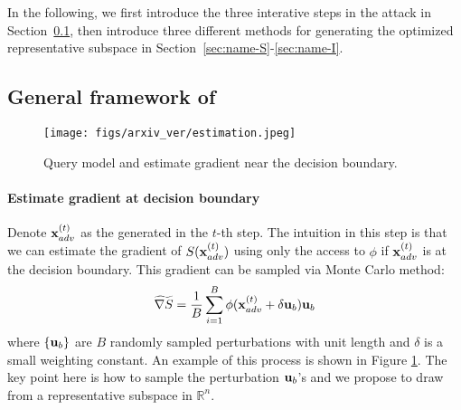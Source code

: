 In the following, we first introduce the three interative steps in the attack in Section~\ref{sec:iterative_attack}, then introduce three different methods for generating the optimized representative subspace in Section~\ref{sec:name-S}-\ref{sec:name-I}. 

\subsection{General framework of \name}
\label{sec:iterative_attack}

\begin{figure}
    \centering
    \texttt{[image: figs/arxiv\_ver/estimation.jpeg]}
    \caption{Query model and estimate gradient near the decision boundary.}
    \label{fig:gradient_estimation}
\end{figure}

\paragraph{Estimate gradient at decision boundary}
Denote ${\bf x}_{adv}^{(t)}$ as the \advimage generated in the $t$-th step. The intuition in this step is that we can estimate the gradient of $S({\bf x}_{adv}^{(t)})$ using only the access to $\phi$ if ${\bf x}_{adv}^{(t)}$ is at the decision boundary. This gradient can be sampled via Monte Carlo method:
\begin{align}
    \widetilde{\nabla S} = \frac1B \sum_{i=1}^B \phi({\bf x}_{adv}^{(t)}+\delta {\bf u}_b) {\bf u}_b
    \label{eq:MC_gradient_estimation}
\end{align}
where $\{{\bf u}_b\}$ are $B$ randomly sampled perturbations with unit length and $\delta$ is a small weighting constant. An example of this process is shown in Figure \ref{fig:gradient_estimation}. The key point here is how to sample the perturbation ${\bf u}_b$'s and we propose to draw from a representative subspace in $\mathbb{R}^n$.

